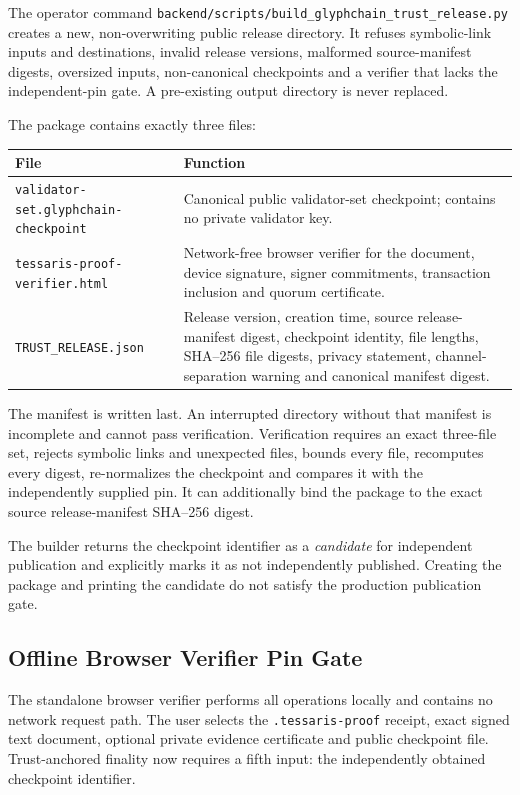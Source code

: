 The operator command
\texttt{backend/scripts/build\_glyphchain\_trust\_release.py} creates a new,
non-overwriting public release directory.  It refuses symbolic-link inputs and
destinations, invalid release versions, malformed source-manifest digests,
oversized inputs, non-canonical checkpoints and a verifier that lacks the
independent-pin gate.  A pre-existing output directory is never replaced.

The package contains exactly three files:

\begin{center}
\begin{tabularx}{\textwidth}{@{}lX@{}}
\toprule
\textbf{File} & \textbf{Function} \\
\midrule
\texttt{validator-set.glyphchain-checkpoint} & Canonical public validator-set
checkpoint; contains no private validator key. \\
\texttt{tessaris-proof-verifier.html} & Network-free browser verifier for the
document, device signature, signer commitments, transaction inclusion and
quorum certificate. \\
\texttt{TRUST\_RELEASE.json} & Release version, creation time, source release-
manifest digest, checkpoint identity, file lengths, SHA--256 file digests,
privacy statement, channel-separation warning and canonical manifest digest. \\
\bottomrule
\end{tabularx}
\end{center}

The manifest is written last.  An interrupted directory without that manifest
is incomplete and cannot pass verification.  Verification requires an exact
three-file set, rejects symbolic links and unexpected files, bounds every file,
recomputes every digest, re-normalizes the checkpoint and compares it with the
independently supplied pin.  It can additionally bind the package to the exact
source release-manifest SHA--256 digest.

The builder returns the checkpoint identifier as a \emph{candidate} for
independent publication and explicitly marks it as not independently published.
Creating the package and printing the candidate do not satisfy the production
publication gate.

\subsection{Offline Browser Verifier Pin Gate}

The standalone browser verifier performs all operations locally and contains no
network request path.  The user selects the \texttt{.tessaris-proof} receipt,
exact signed text document, optional private evidence certificate and public
checkpoint file.  Trust-anchored finality now requires a fifth input: the
independently obtained checkpoint identifier.

